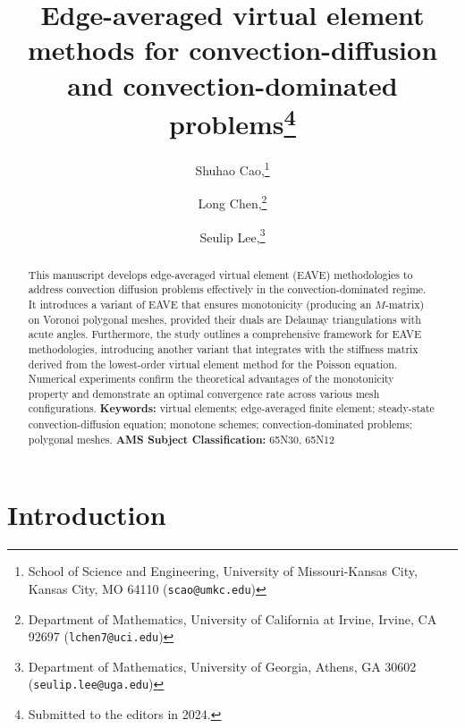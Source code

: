 \documentclass[a4paper]{article}
\title{Edge-averaged virtual element methods for convection-diffusion and convection-dominated problems\footnote{Submitted to the editors in 2024.}}
\author{Shuhao Cao,\thanks{School of Science and Engineering, University of Missouri-Kansas City, Kansas City, MO 64110 (\texttt{scao@umkc.edu})}
\and Long Chen,\thanks{Department of Mathematics, University of California at Irvine, Irvine, CA 92697 (\texttt{lchen7@uci.edu})}
\and Seulip Lee,\thanks{Department of Mathematics, University of Georgia, Athens, GA 30602 (\texttt{seulip.lee@uga.edu})}}
\date{%
}
\theoremstyle{plain}
\theoremstyle{definition}
\numberwithin{equation}{section}
\begin{document}
	\maketitle
	
	\begin{abstract}
		This manuscript develops edge-averaged virtual element (EAVE) methodologies to address convection diffusion problems effectively in the convection-dominated regime. It introduces a variant of EAVE that ensures monotonicity (producing an $M$-matrix) on Voronoi polygonal meshes, provided their duals are Delaunay triangulations with acute angles. Furthermore, the study outlines a comprehensive framework for EAVE methodologies, introducing another variant that integrates with the stiffness matrix derived from the lowest-order virtual element method for the Poisson equation. Numerical experiments confirm the theoretical advantages of the monotonicity property and demonstrate an optimal convergence rate across various mesh configurations.
		\vskip 10pt
		\noindent\textbf{Keywords:} virtual elements; edge-averaged finite element; steady-state convection-diffusion equation; monotone schemes; convection-dominated problems; polygonal meshes.
				\vskip 10pt
		\noindent\textbf{AMS Subject Classification:} 65N30, 65N12
	\end{abstract}

\section{Introduction}\label{sec:intro}
\end{document}
